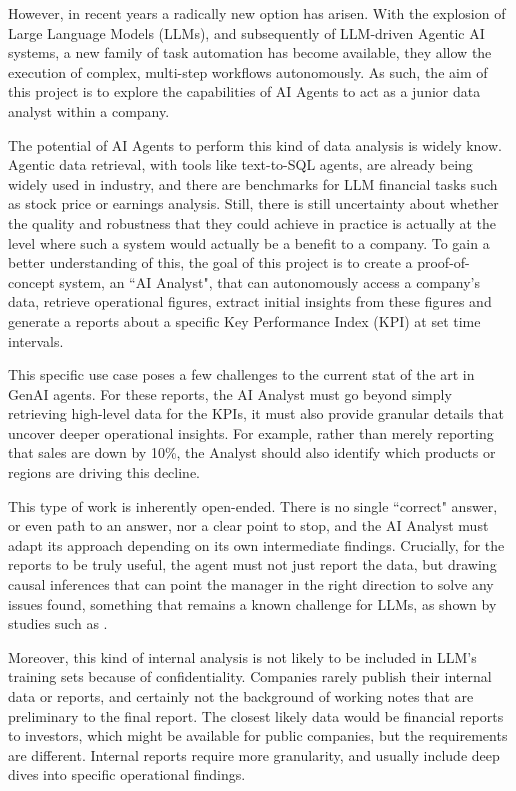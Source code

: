 \documentclass[a4paper]{report}
\begin{document}
However, in recent years a radically new option has arisen. With the explosion of Large Language Models (LLMs), and subsequently of LLM-driven Agentic AI systems, a new family of task automation has become available, they allow the execution of complex, multi-step workflows autonomously. As such, the aim of this project is to explore the capabilities of AI Agents to act as a junior data analyst within a company.

The potential of AI Agents to perform this kind of data analysis is widely know. Agentic data retrieval, with tools like text-to-SQL agents, are already being widely used in industry, and there are benchmarks for LLM financial tasks such as stock price or earnings analysis. Still, there is still uncertainty about whether the quality and robustness that they could achieve in practice is actually at the level where such a system would actually be a benefit to a company. To gain a better understanding of this, the goal of this project is to create a proof-of-concept system, an ``AI Analyst", that can autonomously access a company's data, retrieve operational figures, extract initial insights from these figures and generate a reports about a specific Key Performance Index (KPI) at set time intervals.

This specific use case poses a few challenges to the current stat of the art in GenAI agents. For these reports, the AI Analyst must go beyond simply retrieving high-level data for the KPIs, it must also provide granular details that uncover deeper operational insights. For example, rather than merely reporting that sales are down by 10\%, the Analyst should also identify which products or regions are driving this decline.

This type of work is inherently open-ended. There is no single ``correct" answer, or even path to an answer, nor a clear point to stop, and the AI Analyst must adapt its approach depending on its own intermediate findings. Crucially, for the reports to be truly useful, the agent must not just report the data, but drawing causal inferences that can point the manager in the right direction to solve any issues found, something that remains a known challenge for LLMs, as shown by studies such as \cite{llmcausalreasoning2024}.

Moreover, this kind of internal analysis is not likely to be included in LLM's training sets because of confidentiality. Companies rarely publish their internal data or reports, and certainly not the background of working notes that are preliminary to the final report. The closest likely data would be financial reports to investors, which might be available for public companies, but the requirements are different. Internal reports require more granularity, and usually include deep dives into specific operational findings.
\end{document}
